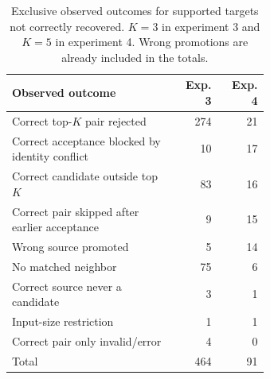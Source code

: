 \begin{table}[htbp]
\caption{Exclusive observed outcomes for supported targets not correctly recovered. $K=3$ in experiment 3 and $K=5$ in experiment 4. Wrong promotions are already included in the totals.}
\label{tab:exp4-barriers}
\centering\small
\begin{tabular}{p{0.64\linewidth}rr}
\toprule
Observed outcome & Exp. 3 & Exp. 4\\
\midrule
Correct top-$K$ pair rejected & 274 & 21\\
Correct acceptance blocked by identity conflict & 10 & 17\\
Correct candidate outside top $K$ & 83 & 16\\
Correct pair skipped after earlier acceptance & 9 & 15\\
Wrong source promoted & 5 & 14\\
No matched neighbor & 75 & 6\\
Correct source never a candidate & 3 & 1\\
Input-size restriction & 1 & 1\\
Correct pair only invalid/error & 4 & 0\\
Total & 464 & 91\\
\bottomrule
\end{tabular}
\end{table}

